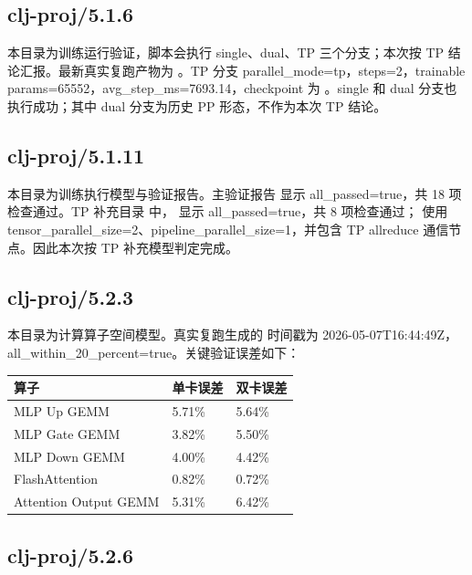 \documentclass[UTF8,a4paper,11pt]{ctexart}
\begin{document}
\subsection{clj-proj/5.1.6}

本目录为训练运行验证，脚本会执行 single、dual、TP 三个分支；本次按 TP 结论汇报。最新真实复跑产物为 。TP 分支 parallel\_mode=tp，steps=2，trainable params=65552，avg\_step\_ms=7693.14，checkpoint 为 。single 和 dual 分支也执行成功；其中 dual 分支为历史 PP 形态，不作为本次 TP 结论。

\subsection{clj-proj/5.1.11}

本目录为训练执行模型与验证报告。主验证报告  显示 all\_passed=true，共 18 项检查通过。TP 补充目录  中， 显示 all\_passed=true，共 8 项检查通过； 使用 tensor\_parallel\_size=2、pipeline\_parallel\_size=1，并包含 TP allreduce 通信节点。因此本次按 TP 补充模型判定完成。

\subsection{clj-proj/5.2.3}

本目录为计算算子空间模型。真实复跑生成的  时间戳为 2026-05-07T16:44:49Z，all\_within\_20\_percent=true。关键验证误差如下：

\begin{center}
\begin{tabular}{L{4.2cm} L{3.2cm} L{3.2cm}}
\toprule
算子 & 单卡误差 & 双卡误差 \\
\midrule
MLP Up GEMM & 5.71\% & 5.64\% \\
MLP Gate GEMM & 3.82\% & 5.50\% \\
MLP Down GEMM & 4.00\% & 4.42\% \\
FlashAttention & 0.82\% & 0.72\% \\
Attention Output GEMM & 5.31\% & 6.42\% \\
\bottomrule
\end{tabular}
\end{center}

\subsection{clj-proj/5.2.6}
\end{document}

